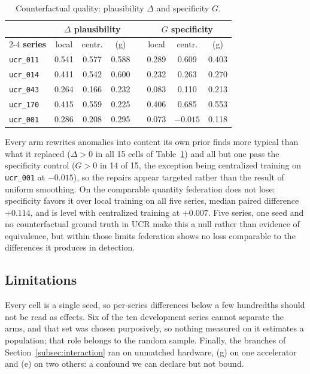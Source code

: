 \documentclass[conference]{IEEEtran}
\begin{document}
\begin{table}[t]
\caption{Counterfactual quality: plausibility $\Delta$ and specificity $G$.}
\label{tab:cf}
\centering
\scriptsize
\setlength{\tabcolsep}{2.2pt}
\renewcommand{\arraystretch}{1.1}
\begin{tabular}{@{}l ccc c ccc@{}}
\hline
& \multicolumn{3}{c}{\textbf{$\Delta$ plausibility}}
& & \multicolumn{3}{c}{\textbf{$G$ specificity}} \\
\cline{2-4}\cline{6-8}
\textbf{series} & local & centr. & (g) & & local & centr. & (g) \\
\hline
\texttt{ucr\_011} & 0.541 & 0.577 & 0.588 & & 0.289 & 0.609 & 0.403 \\
\texttt{ucr\_014} & 0.411 & 0.542 & 0.600 & & 0.232 & 0.263 & 0.270 \\
\texttt{ucr\_043} & 0.264 & 0.166 & 0.232 & & 0.083 & 0.110 & 0.213 \\
\texttt{ucr\_170} & 0.415 & 0.559 & 0.225 & & 0.406 & 0.685 & 0.553 \\
\hline
\texttt{ucr\_001} & 0.286 & 0.208 & 0.295 & & 0.073 & $-0.015$ & 0.118 \\
\hline
\end{tabular}
\end{table}

Every arm rewrites anomalies into content its own prior finds more typical than what it replaced
($\Delta>0$ in all 15 cells of Table~\ref{tab:cf}) and all but one pass the specificity control ($G>0$ in 14
of 15, the exception being centralized training on \texttt{ucr\_001} at $-0.015$), so the repairs
appear targeted rather than the result of uniform smoothing. On the comparable quantity federation
does not lose: specificity favors it over local training on all five series, median paired
difference $+0.114$, and is level with centralized training at $+0.007$. Five series, one seed and no counterfactual ground truth
in UCR make this a null rather than evidence of equivalence, but within those limits federation
shows no loss comparable to the differences it produces in detection.

\subsection{Limitations}
\label{subsec:limitations}

Every cell is a single seed, so per-series differences below a few hundredths should not be read as
effects. Six of the ten development series cannot separate the arms, and that set was chosen
purposively, so nothing measured on it estimates a population; that role belongs to the random
sample. Finally, the branches
of Section~\ref{subsec:interaction} ran on unmatched hardware, (g) on one accelerator and (e) on two
others: a confound we can declare but not bound.
\end{document}
